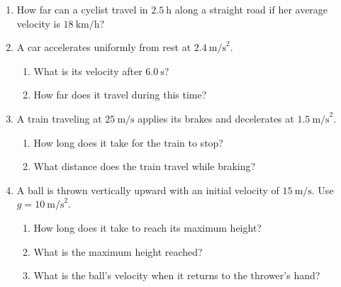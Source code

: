 \documentclass[12pt, twoside]{article}
\begin{document}
\begin{enumerate}[itemsep=0.75cm]
\textbf{Formulas:} \quad $v = v_0 + at$ \quad\quad $d = v_0 t + \frac{1}{2}at^2$ \quad\quad $v^2 = v_0^2 + 2ad$ \quad\quad $d = \frac{1}{2}(v_0 + v)t$

\vspace{1cm}

\item How far can a cyclist travel in $2.5~\text{h}$ along a straight road if her average velocity is $18~\text{km/h}$?
  \vspace{4cm}

\item A car accelerates uniformly from rest at $2.4~\text{m/s}^2$.
  \begin{enumerate}[itemsep=3cm]
    \item What is its velocity after $6.0~\text{s}$?
    \item How far does it travel during this time?
  \end{enumerate}
  \vspace{2cm}

\newpage
\item A train traveling at $25~\text{m/s}$ applies its brakes and decelerates at $1.5~\text{m/s}^2$.
  \begin{enumerate}[itemsep=3.5cm]
    \item How long does it take for the train to stop?
    \item What distance does the train travel while braking?
  \end{enumerate}
  \vspace{2cm}

\item A ball is thrown vertically upward with an initial velocity of $15~\text{m/s}$. Use $g = 10~\text{m/s}^2$.
  \begin{enumerate}[itemsep=3.5cm]
    \item How long does it take to reach its maximum height?
    \item What is the maximum height reached?
    \item What is the ball's velocity when it returns to the thrower's hand?
  \end{enumerate}

\end{enumerate}
\end{document}
